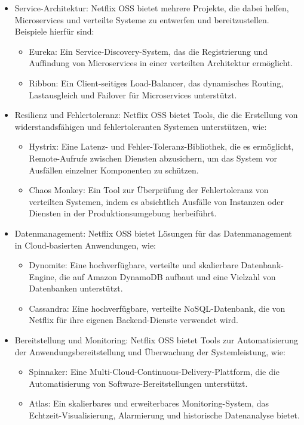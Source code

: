 \documentclass[../vs-script-first-v01.tex]{subfiles}
\begin{document}
\begin{itemize}
\item Service-Architektur: Netflix OSS bietet mehrere Projekte, die dabei helfen, Microservices und verteilte Systeme zu entwerfen und bereitzustellen. Beispiele hierfür sind:
\begin{itemize}
\item Eureka: Ein Service-Discovery-System, das die Registrierung und Auffindung von Microservices in einer verteilten Architektur ermöglicht.
\item Ribbon: Ein Client-seitiges Load-Balancer, das dynamisches Routing, Lastausgleich und Failover für Microservices unterstützt.
\end{itemize}
\item Resilienz und Fehlertoleranz: Netflix OSS bietet Tools, die die Erstellung von widerstandsfähigen und fehlertoleranten Systemen unterstützen, wie:
\begin{itemize}
\item Hystrix: Eine Latenz- und Fehler-Toleranz-Bibliothek, die es ermöglicht, Remote-Aufrufe zwischen Diensten abzusichern, um das System vor Ausfällen einzelner Komponenten zu schützen.
\item Chaos Monkey: Ein Tool zur Überprüfung der Fehlertoleranz von verteilten Systemen, indem es absichtlich Ausfälle von Instanzen oder Diensten in der Produktionsumgebung herbeiführt.
\end{itemize}
\item Datenmanagement: Netflix OSS bietet Lösungen für das Datenmanagement in Cloud-basierten Anwendungen, wie:
\begin{itemize}
\item Dynomite: Eine hochverfügbare, verteilte und skalierbare Datenbank-Engine, die auf Amazon DynamoDB aufbaut und eine Vielzahl von Datenbanken unterstützt.
\item Cassandra: Eine hochverfügbare, verteilte NoSQL-Datenbank, die von Netflix für ihre eigenen Backend-Dienste verwendet wird.
\end{itemize}
\item Bereitstellung und Monitoring: Netflix OSS bietet Tools zur Automatisierung der Anwendungsbereitstellung und Überwachung der Systemleistung, wie:
\begin{itemize}
\item Spinnaker: Eine Multi-Cloud-Continuous-Delivery-Plattform, die die Automatisierung von Software-Bereitstellungen unterstützt.
\item Atlas: Ein skalierbares und erweiterbares Monitoring-System, das Echtzeit-Visualisierung, Alarmierung und historische Datenanalyse bietet.

\end{itemize}
\end{itemize}
\end{document}
